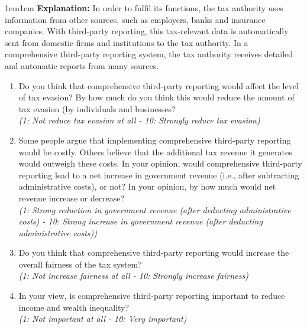 \documentclass[11pt]{article}
\begin{document}
\begin{adjustwidth}{1em}{1em}  \textbf{Explanation:} In order to fulfil its functions, the tax authority uses information from other sources, such as employers, banks and insurance companies. With third-party reporting, this tax-relevant data is automatically sent from domestic firms and institutions to the tax authority. In a comprehensive third-party reporting system, the tax authority receives detailed and automatic reports from many sources.
\end{adjustwidth}
\begin{enumerate}[resume]
    \item Do you think that comprehensive third-party reporting would affect the level of tax evasion? By how much do you think this would reduce the amount of tax evasion (by individuals and businesses?\\
    \textit{(1: Not reduce tax evasion at all - 10: Strongly reduce tax evasion)}
    \item Some people argue that implementing comprehensive third-party reporting would be costly. Others believe that the additional tax revenue it generates would outweigh these costs. In your opinion, would comprehensive third-party reporting lead to a net increase in government revenue (i.e., after subtracting administrative costs), or not? In your opinion, by how much would net revenue increase or decrease?  \\
    \textit{(1: Strong reduction in government revenue (after deducting administrative costs) - 10: Strong increase in government revenue (after deducting administrative costs))}
    \item Do you think that comprehensive third-party reporting would increase the overall fairness of the tax system?\\
    \textit{(1: Not increase fairness at all - 10: Strongly increase fairness)}
    \item In your view, is comprehensive third-party reporting important to reduce income and wealth inequality?\\
    \textit{(1: Not important at all - 10: Very important)}
\end{enumerate}
\end{document}
